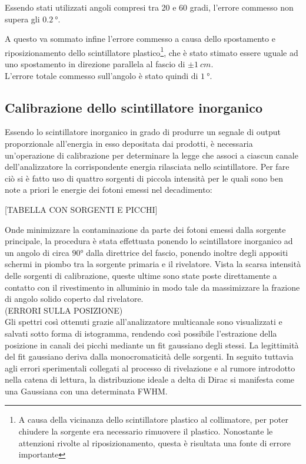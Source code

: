 \documentclass[8pt]{extarticle}
\begin{document}
Essendo stati utilizzati angoli compresi tra 20 e 60 gradi, l'errore commesso non supera gli $0.2 \ °$.

A questo va sommato infine l'errore commesso a causa dello spostamento e riposizionamento dello scintillatore plastico\footnote{A causa della vicinanza dello scintillatore plastico al collimatore, per poter chiudere la sorgente era necessario rimuovere il plastico. Nonostante le attenzioni rivolte al riposizionamento, questa è risultata una fonte di errore importante}, che è stato stimato essere uguale ad uno spostamento in direzione parallela al fascio di $\pm 1 \ cm$. \\

L'errore totale commesso sull'angolo è stato quindi di $1 \ °$.


\subsection{Calibrazione dello scintillatore inorganico}

Essendo lo scintillatore inorganico in grado di produrre un segnale di output proporzionale all'energia in esso depositata dai prodotti, è necessaria un'operazione di calibrazione per determinare la legge che associ a ciascun canale dell'analizzatore la corrispondente energia rilasciata nello scintillatore. 
Per fare ciò si è fatto uso di quattro sorgenti di piccola intensità per le quali sono ben note a priori le energie dei fotoni emessi nel decadimento:

[TABELLA CON SORGENTI E PICCHI]

Onde minimizzare la contaminazione da parte dei fotoni emessi dalla sorgente principale, la procedura è stata effettuata ponendo lo scintillatore inorganico ad un angolo di circa $90°$ dalla direttrice del fascio, ponendo inoltre degli appositi schermi in piombo tra la sorgente primaria e il rivelatore. Vista la scarsa intensità delle sorgenti di calibrazione, queste ultime sono state poste direttamente a contatto con il rivestimento in alluminio in modo tale da massimizzare la frazione di angolo solido coperto dal rivelatore.\\
(ERRORI SULLA POSIZIONE)\\
Gli spettri così ottenuti grazie all'analizzatore multicanale sono visualizzati e salvati sotto forma di istogramma, rendendo così possibile l'estrazione della posizione in canali dei picchi mediante un fit gaussiano degli stessi. La legittimità del fit gaussiano deriva dalla monocromaticità delle sorgenti. In seguito tuttavia agli errori sperimentali collegati al processo di rivelazione e al rumore introdotto nella catena di lettura, la distribuzione ideale a delta di Dirac si manifesta come una Gaussiana con una determinata FWHM.\\
\end{document}
